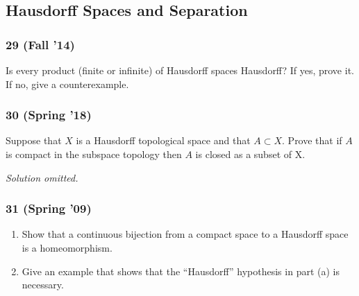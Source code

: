 \hypertarget{hausdorff-spaces-and-separation}{%
\subsection{Hausdorff Spaces and
Separation}\label{hausdorff-spaces-and-separation}}

\hypertarget{fall-14-2}{%
\subsubsection{29 (Fall '14)}\label{fall-14-2}}

\begin{problem}[?]

Is every product (finite or infinite) of Hausdorff spaces Hausdorff? If
yes, prove it. If no, give a counterexample.

\end{problem}

\hypertarget{spring-18}{%
\subsubsection{30 (Spring '18)}\label{spring-18}}

\begin{problem}[?]

Suppose that \(X\) is a Hausdorff topological space and that
\(A \subset X\). Prove that if \(A\) is compact in the subspace topology
then \(A\) is closed as a subset of X.

\end{problem}

\emph{Solution omitted.}

\hypertarget{spring-09-1}{%
\subsubsection{31 (Spring '09)}\label{spring-09-1}}

\begin{problem}[Spring 2009, 31]

\envlist

\begin{enumerate}
\def\labelenumi{\alph{enumi}.}
\item
  Show that a continuous bijection from a compact space to a Hausdorff
  space is a homeomorphism.
\item
  Give an example that shows that the ``Hausdorff'' hypothesis in part
  (a) is necessary.
\end{enumerate}

\end{problem}

